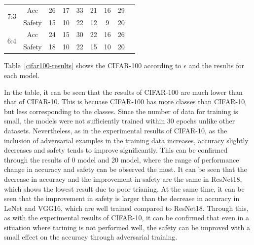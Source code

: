 \documentclass[journal,article,submit,moreauthors,pdftex]{Definitions/mdpi}
\begin{document}
\begin{specialtable}[H]
{\begin{tabular}{|c|c|c|c|c|c|c|c|c|}
    \multirow{2}{*}{7:3}         & Acc                       & 26                  & 17                    & 33          & 21                 & 16                    & 29                 \\ \cline{2-8} 
                                 & Safety                    & 15                  & 10                    & 22          & 12                 & 9                     & 20                 \\ \hline 
    \multirow{2}{*}{6:4}         & Acc                       & 24                  & 15                    & 30          & 22                 & 16                    & 26                 \\ \cline{2-8} 
                                 & Safety                    & 18                  & 10                    & 22          & 15                 & 10                    & 20                 \\ \hline 
    \end{tabular}
    }
\end{specialtable}

Table~\ref{cifar100-results} shows the CIFAR-100 according to \begin{math}\epsilon\end{math} and the results for each model.

In the table, it can be seen that the results of CIFAR-100 are much lower than that of CIFAR-10.
This is becuase CIFAR-100 has more classes than CIFAR-10, but less corresponding to the classes. Since the number of data for training is small, the models were not sufficiently trained within 30 epochs unlike other datasets. 
Nevertheless, as in the experimental results of CIFAR-10, as the inclusion of adversarial examples in the training data increases, accuracy slightly decreases and safety tends to improve significantly.
This can be confirmed through the results of 0 model and 20 model, where the range of performance change in accuracy and safety can be observed the most.
It can be seen that the decrease in accuracy and the improvement in safety are the same in ResNet18, which shows the lowest result due to poor trianing.
At the same time, it can be seen that the improvement in safety is larger than the decrease in accuracy in LeNet and VGG16, which are well trained compared to ResNet18.
Through this, as with the experimental results of CIFAR-10, it can be confirmed that even in a situation where tarining is not performed well, the safety can be improved with a small effect on the accuracy through adversarial training.
\end{document}
